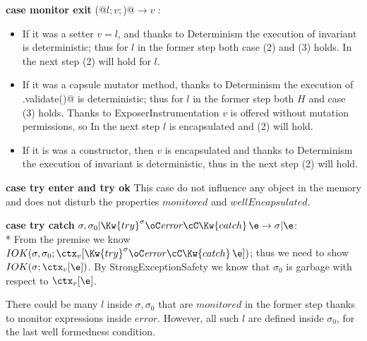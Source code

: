 \noindent\textbf{case monitor exit} \Q@M(@$l;v;$\Q@true)@$\rightarrow v$ :
  \begin{itemize}
\item
    If it was a setter $v=l$, and 
    thanks to Determinism the execution of invariant is deterministic;
    thus for $l$ in the former step both case (2) and (3) holds.
    In the next step (2) will hold for $l$.
\item
    If it was a capsule mutator method, thanks to Determinism the execution
 of \Q@.validate()@ is deterministic;
    thus for $l$ in the former step both $H$ and case (3) holds.
    Thanks to ExposerInstrumentation $v$ is offered without mutation permissions, so
    In the next step $l$ is encapsulated and (2) will hold.
\item
    If it is was a constructor, 
    then $v$ is encapsulated and thanks to Determinism
    the execution of invariant is deterministic, thus in the next step (2) will hold.
\end{itemize}

\noindent\textbf{case try enter and try ok}
This case do not influence any object in the memory and does not
disturb the properties $\mathit{monitored}$ and $\mathit{wellEncapsulated}$.

\noindent\textbf{case try catch} $\sigma,\sigma_0|\Kw{try}^\sigma \oC\mathit{error}\cC\Kw{catch}\, \e\rightarrow \sigma|\e$:\\*
From the premise we know 
$IOK(\sigma,\sigma_0;\ctx_v[\Kw{try}^\sigma \oC\mathit{error}\cC\Kw{catch}\, \e])$;
thus we need to show
$IOK(\sigma;\ctx_v[\e])$.
By StrongExceptionSafety we know that $\sigma_0$ is garbage with respect to $\ctx_v[\e]$.

There could be many $l$ inside $\sigma,\sigma_0$ that are $\mathit{monitored}$
in the former step thanks to monitor expressions inside $\mathit{error}$.
However, all such $l$ are defined inside $\sigma_0$,
for the last well formedness condition.